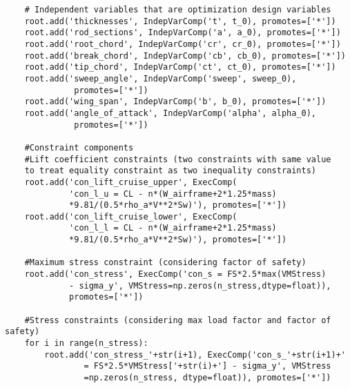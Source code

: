 \begin{lstlisting}
    # Independent variables that are optimization design variables
    root.add('thicknesses', IndepVarComp('t', t_0), promotes=['*'])
    root.add('rod_sections', IndepVarComp('a', a_0), promotes=['*'])
    root.add('root_chord', IndepVarComp('cr', cr_0), promotes=['*'])
    root.add('break_chord', IndepVarComp('cb', cb_0), promotes=['*'])
    root.add('tip_chord', IndepVarComp('ct', ct_0), promotes=['*'])
    root.add('sweep_angle', IndepVarComp('sweep', sweep_0), 
              promotes=['*'])
    root.add('wing_span', IndepVarComp('b', b_0), promotes=['*'])
    root.add('angle_of_attack', IndepVarComp('alpha', alpha_0), 
              promotes=['*'])

    #Constraint components
    #Lift coefficient constraints (two constraints with same value 
    to treat equality constraint as two inequality constraints)
    root.add('con_lift_cruise_upper', ExecComp(
             'con_l_u = CL - n*(W_airframe+2*1.25*mass)
             *9.81/(0.5*rho_a*V**2*Sw)'), promotes=['*'])
    root.add('con_lift_cruise_lower', ExecComp(
             'con_l_l = CL - n*(W_airframe+2*1.25*mass)
             *9.81/(0.5*rho_a*V**2*Sw)'), promotes=['*'])

    #Maximum stress constraint (considering factor of safety)
    root.add('con_stress', ExecComp('con_s = FS*2.5*max(VMStress) 
             - sigma_y', VMStress=np.zeros(n_stress,dtype=float)), 
             promotes=['*'])

    #Stress constraints (considering max load factor and factor of safety)
    for i in range(n_stress):
        root.add('con_stress_'+str(i+1), ExecComp('con_s_'+str(i+1)+' 
                = FS*2.5*VMStress['+str(i)+'] - sigma_y', VMStress
                =np.zeros(n_stress, dtype=float)), promotes=['*'])
\end{lstlisting}


